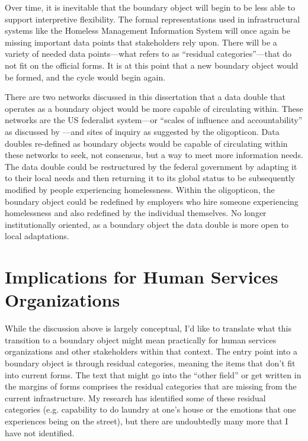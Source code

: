 Over time, it is inevitable that the boundary object will begin to be less able to support interpretive flexibility. The formal representations used in infrastructural systems like the Homeless Management Information System will once again be missing important data points that stakeholders rely upon. There will be a variety of needed data points---what \citet{Star2010Boundary} refers to as ``residual categories''---that do not fit on the official forms. It is at this point that a new boundary object would be formed, and the cycle would begin again.

There are two networks discussed in this dissertation that a data double that operates as a boundary object would be more capable of circulating within. These networks are the US federalist system---or ``scales of influence and accountability” as discussed by \citet{LeDantec2008Trenches}---and sites of inquiry as suggested by the oligopticon. Data doubles re-defined as boundary objects would be capable of circulating within these networks to seek, not consensus, but a way to meet more information needs. The data double could be restructured by the federal government by adapting it to their local needs and then returning it to its global status to be subsequently modified by people experiencing homelessness. Within the oligopticon, the boundary object could be redefined by employers who hire someone experiencing homelessness and also redefined by the individual themselves. No longer institutionally oriented, as a boundary object the data double is more open to local adaptations.

\section{Implications for Human Services Organizations}
While the discussion above is largely conceptual, I'd like to translate what this transition to a boundary object might mean practically for human services organizations and other stakeholders within that context. The entry point into a boundary object is through residual categories, meaning the items that don't fit into current forms. The text that might go into the ``other field'' or get written in the margins of forms comprises the residual categories that are missing from the current infrastructure. My research has identified some of these residual categories (e.g. capability to do laundry at one's house or the emotions that one experiences being on the street), but there are undoubtedly many more that I have not identified.

